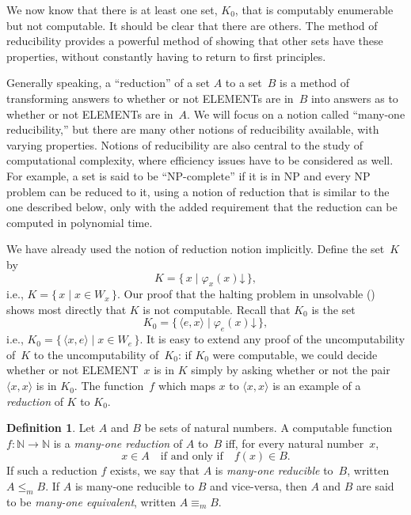 \documentclass[10pt,a4paper]{article}
\makeatletter
\newcommand*{\olup}[1]{\MakeUppercase{#1}}
\theoremstyle{plain}
\theoremstyle{definition}
\newtheorem{defn}[thm]{Definition}
\theoremstyle{remark}
\newenvironment{explain}{}{}
\newcommand{\olref}{\@ifnextchar[{\olref@i}{\olref@final}}
\def\olref@i[#1]{\@ifnextchar[{\olref@ii}{\olref@final}}
\def\olref@ii[#1]{\@ifnextchar[{\olref@iii}{\olref@final}}
\def\olref@iii[#1]{\olref@final}
\def\olref@final#1{\ref{#1}}
\providecommand{\tuple}[1]{\langle #1 \rangle}
\providecommand{\cfind}[1]{\varphi_{#1}}
\providecommand{\Nat}{\ensuremath{\mathbb{N}}}
\providecommand{\fdefined}{\mathord{\downarrow}}
\providecommand{\Setabs}[2]{\{\, #1 \mid #2 \,\}}
\makeatother
\begin{document}
\begin{explain}
We now know that there is at least one set, $K_0$, that is computably
enumerable but not computable. It should be clear that there are
others. The method of reducibility provides a powerful method of
showing that other sets have these properties, without constantly
having to return to first principles.

Generally speaking, a ``reduction'' of a set $A$ to a set~$B$ is a
method of transforming answers to whether or not \olup{element}s are in~$B$
into answers as to whether or not \olup{element}s are in~$A$. We will focus
on a notion called ``many-one reducibility,'' but there are many other
notions of reducibility available, with varying properties. Notions of
reducibility are also central to the study of computational
complexity, where efficiency issues have to be considered as well. For
example, a set is said to be ``NP-complete'' if it is in NP and every
NP problem can be reduced to it, using a notion of reduction that is
similar to the one described below, only with the added requirement
that the reduction can be computed in polynomial time.

We have already used the notion of reduction notion implicitly. Define
the set~$K$ by
\[
K = \Setabs{x}{\cfind{x}(x) \fdefined},
\]
i.e., $K = \Setabs{x}{x \in W_x}$. Our proof that the halting problem
in unsolvable (\olref[hlt]{thm:halting-problem}) shows most directly
that $K$ is not computable. Recall that $K_0$ is the set
\[
K_0 = \Setabs{\tuple{e, x}}{\cfind{e}(x) \fdefined },
\]
i.e., $K_0 = \Setabs{\tuple{x,e}}{x \in W_e}$. It is easy to extend
any proof of the uncomputability of~$K$ to the uncomputability
of~$K_0$: if $K_0$ were computable, we could decide whether or not
\olup{element}~$x$ is in $K$ simply by asking whether or not the pair
$\tuple{x, x}$ is in $K_0$. The function~$f$ which maps $x$ to
$\tuple{x, x}$ is an example of a \emph{reduction} of $K$ to $K_0$.
\end{explain}

\begin{defn}
Let $A$ and $B$ be sets of natural numbers. A computable
function~$f\colon \Nat \to \Nat$ is a \emph{many-one reduction} of $A$
to~$B$ iff, for every natural number~$x$,
\[
x \in A \quad \text{if and only if} \quad f(x) \in B.
\]
If such a reduction $f$ exists, we say that $A$ is \emph{many-one
reducible} to~$B$, written $A \leq_m B$. If $A$ is many-one reducible
to $B$ and vice-versa, then $A$ and $B$ are said to be \emph{many-one
equivalent}, written $A \equiv_m B$.
\end{defn}
\end{document}
